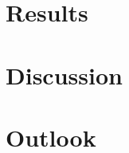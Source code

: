 \documentclass[preprint,12pt]{elsarticle}
\begin{document}
\section{Results}
\label{sec:results}








\section{Discussion}
\label{sec:discussion}




\section{Outlook}
\label{sec:outlook}


















\end{document}

